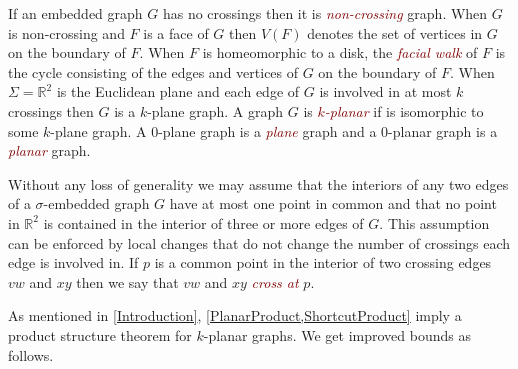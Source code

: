 \documentclass{patmorin}
\theoremstyle{plain}
\theoremstyle{definition}
\newcommand{\defin}[1]{\textcolor{Maroon}{\emph{#1}}}
\newcommand{\note}[2]{\noindent{\color{red}[#1:~#2]}}
\newcommand{\R}{\mathbb{R}}
\begin{document}
If an embedded graph $G$  has no crossings then it is \defin{non-crossing} graph.  When $G$ is non-crossing and $F$ is a face of $G$ then $V(F)$ denotes the set of vertices in $G$ on the boundary of $F$.  When $F$ is homeomorphic to a disk, the \defin{facial walk} of $F$ is the cycle consisting of the edges and vertices of $G$ on the boundary of $F$.  When $\Sigma=\R^2$ is the Euclidean plane and each edge of $G$ is involved in at most $k$ crossings then $G$ is a $k$-plane graph.  A graph $G$ is \defin{$k$-planar} if is isomorphic to some $k$-plane graph.  A $0$-plane graph is a \defin{plane} graph and a $0$-planar graph is a \defin{planar} graph.


Without any loss of generality we may assume that the interiors of any two edges of a $\sigma$-embedded graph $G$ have at most one point in common and that no point in $\R^2$ is contained in the interior of three or more edges of $G$.  This assumption can be enforced by local changes that do not change the number of crossings each edge is involved in.  If $p$ is a common point in the interior of two crossing edges $vw$ and $xy$ then we say that $vw$ and $xy$ \defin{cross at} $p$.





%

As mentioned in \cref{Introduction}, \cref{PlanarProduct,ShortcutProduct} imply a product structure theorem for $k$-planar graphs. We get improved bounds as follows.
\end{document}

